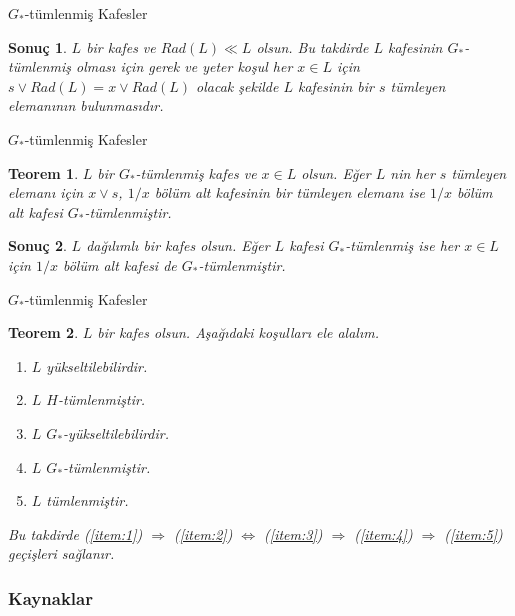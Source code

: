 \documentclass[mathserif]{beamer}
\newtheorem*{teorem}{Teorem}
\newtheorem*{sonuc}{Sonuç}
\begin{document}
\begin{frame}{$ G_* $-tümlenmiş Kafesler}
  \begin{sonuc}
    $ L $ bir kafes ve $ Rad(L) \ll L $ olsun. Bu takdirde $ L $ kafesinin $ G_* $-tümlenmiş olması için gerek ve yeter koşul her 
    $ x \in L $ için $ s \vee Rad(L) = x \vee Rad(L) $ olacak şekilde $ L $ kafesinin bir $ s $ tümleyen elemanının bulunmasıdır.
  \end{sonuc}

\end{frame}


\begin{frame}{$ G_* $-tümlenmiş Kafesler}
  \begin{teorem}
    $ L $ bir $ G_* $-tümlenmiş kafes ve $ x \in L $ olsun. Eğer $ L $ nin her $ s $ tümleyen elemanı için $ x \vee s $, $ 1/x $
    bölüm alt kafesinin bir tümleyen elemanı ise $ 1/x $ bölüm alt kafesi $ G_* $-tümlenmiştir.

  \end{teorem}
  \begin{sonuc}
    $ L $ dağılımlı bir kafes olsun. Eğer $ L $ kafesi $ G_* $-tümlenmiş ise her $ x \in L $ için $ 1/x  $ bölüm alt kafesi de $ G_* $-tümlenmiştir.
  \end{sonuc}

\end{frame}

\begin{frame}{$ G_* $-tümlenmiş Kafesler}
  \begin{teorem}
    $ L $ bir kafes olsun. Aşağıdaki koşulları ele alalım.
    \begin{enumerate}
      \item $ L $ yükseltilebilirdir. \label{item:1}
      \item $ L $ $ H $-tümlenmiştir. \label{item:2}

      \item $ L $ $ G_* $-yükseltilebilirdir. \label{item:3}

      \item $ L $ $ G_* $-tümlenmiştir. \label{item:4}

      \item $ L $ tümlenmiştir. \label{item:5}

    \end{enumerate}
    Bu takdirde  (\ref{item:1}) $ \Rightarrow $ (\ref{item:2}) $ \Leftrightarrow $ (\ref{item:3}) $ \Rightarrow $ (\ref{item:4}) $ \Rightarrow $ (\ref{item:5}) 
    geçişleri sağlanır.

  \end{teorem}
\end{frame}

\begin{frame}[allowframebreaks]
        \frametitle{Kaynaklar}
\nocite{*}
        
        
\end{frame}
\end{document}
